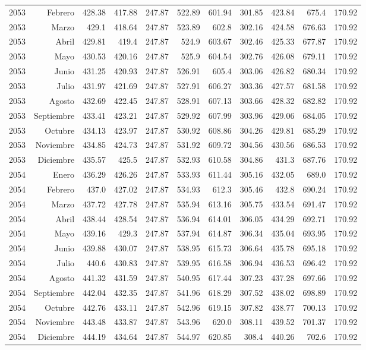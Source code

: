 \documentclass{article}%
\begin{document}
\begin{longtable}{|l r|r|r|r|r|r|r|r|r|r|}
2053&Febrero&428.38&417.88&247.87&522.89&601.94&301.85&423.84&675.4&170.92\\%
2053&Marzo&429.1&418.64&247.87&523.89&602.8&302.16&424.58&676.63&170.92\\%
2053&Abril&429.81&419.4&247.87&524.9&603.67&302.46&425.33&677.87&170.92\\%
2053&Mayo&430.53&420.16&247.87&525.9&604.54&302.76&426.08&679.11&170.92\\%
2053&Junio&431.25&420.93&247.87&526.91&605.4&303.06&426.82&680.34&170.92\\%
2053&Julio&431.97&421.69&247.87&527.91&606.27&303.36&427.57&681.58&170.92\\%
2053&Agosto&432.69&422.45&247.87&528.91&607.13&303.66&428.32&682.82&170.92\\%
2053&Septiembre&433.41&423.21&247.87&529.92&607.99&303.96&429.06&684.05&170.92\\%
2053&Octubre&434.13&423.97&247.87&530.92&608.86&304.26&429.81&685.29&170.92\\%
2053&Noviembre&434.85&424.73&247.87&531.92&609.72&304.56&430.56&686.53&170.92\\%
2053&Diciembre&435.57&425.5&247.87&532.93&610.58&304.86&431.3&687.76&170.92\\%
2054&Enero&436.29&426.26&247.87&533.93&611.44&305.16&432.05&689.0&170.92\\%
2054&Febrero&437.0&427.02&247.87&534.93&612.3&305.46&432.8&690.24&170.92\\%
2054&Marzo&437.72&427.78&247.87&535.94&613.16&305.75&433.54&691.47&170.92\\%
2054&Abril&438.44&428.54&247.87&536.94&614.01&306.05&434.29&692.71&170.92\\%
2054&Mayo&439.16&429.3&247.87&537.94&614.87&306.34&435.04&693.95&170.92\\%
2054&Junio&439.88&430.07&247.87&538.95&615.73&306.64&435.78&695.18&170.92\\%
2054&Julio&440.6&430.83&247.87&539.95&616.58&306.94&436.53&696.42&170.92\\%
2054&Agosto&441.32&431.59&247.87&540.95&617.44&307.23&437.28&697.66&170.92\\%
2054&Septiembre&442.04&432.35&247.87&541.96&618.29&307.52&438.02&698.89&170.92\\%
2054&Octubre&442.76&433.11&247.87&542.96&619.15&307.82&438.77&700.13&170.92\\%
2054&Noviembre&443.48&433.87&247.87&543.96&620.0&308.11&439.52&701.37&170.92\\%
2054&Diciembre&444.19&434.64&247.87&544.97&620.85&308.4&440.26&702.6&170.92\\%

\end{longtable}
\end{document}
